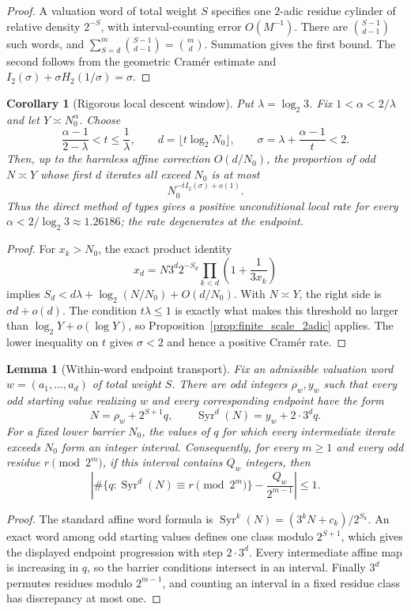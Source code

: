 \documentclass[12pt,a4paper]{article}
\newtheorem{lemma}[theorem]{Lemma}
\newtheorem{corollary}[theorem]{Corollary}
\theoremstyle{remark}
\begin{document}
\begin{proof}
A valuation word of total weight $S$ specifies one $2$-adic residue cylinder
of relative density $2^{-S}$, with interval-counting error $O(M^{-1})$.
There are $\binom{S-1}{d-1}$ such words, and
$\sum_{S=d}^m\binom{S-1}{d-1}=\binom md$.  Summation gives the first bound.
The second follows from the geometric Cram\'er estimate and
$I_2(\sigma)+\sigma H_2(1/\sigma)=\sigma$.
\end{proof}
\begin{corollary}[Rigorous local descent window]
\label{cor:local_descent}
Put $\lambda=\log_2 3$.  Fix
$1<\alpha<2/\lambda$ and let $Y\asymp N_0^\alpha$.  Choose
\[
\frac{\alpha-1}{2-\lambda}<t\le\frac1\lambda,
\qquad d=\lfloor t\log_2N_0\rfloor,
\qquad \sigma=\lambda+\frac{\alpha-1}{t}<2.
\]
Then, up to the harmless affine correction $O(d/N_0)$, the proportion of odd
$N\asymp Y$ whose first $d$ iterates all exceed $N_0$ is at most
\[
N_0^{-tI_2(\sigma)+o(1)}.
\]
Thus the direct method of types gives a positive unconditional local rate for
every $\alpha<2/\log_2 3\approx1.26186$; the rate degenerates at the endpoint.
\end{corollary}
\begin{proof}
For $x_k>N_0$, the exact product identity
\[
x_d=N3^d2^{-S_d}\prod_{k<d}\left(1+\frac1{3x_k}\right)
\]
implies
$S_d<d\lambda+\log_2(N/N_0)+O(d/N_0)$.  With $N\asymp Y$, the right side is
$\sigma d+o(d)$.  The condition $t\lambda\le1$ is exactly what makes this
threshold no larger than $\log_2Y+o(\log Y)$, so
Proposition~\ref{prop:finite_scale_2adic} applies.  The lower inequality on
$t$ gives $\sigma<2$ and hence a positive Cram\'er rate.
\end{proof}
\begin{lemma}[Within-word endpoint transport]
\label{lem:within_word_transport}
Fix an admissible valuation word $w=(a_1,\ldots,a_d)$ of total weight $S$.
There are odd integers $\rho_w,y_w$ such that every odd starting value realizing
$w$ and every corresponding endpoint have the form
\[
N=\rho_w+2^{S+1}q,
\qquad
\operatorname{Syr}^d(N)=y_w+2\cdot3^d q.
\]
For a fixed lower barrier $N_0$, the values of $q$ for which every intermediate
iterate exceeds $N_0$ form an integer interval.  Consequently, for every
$m\ge1$ and every odd residue $r\pmod{2^m}$, if this interval contains $Q_w$
integers, then
\[
\left|\#\{q:\operatorname{Syr}^d(N)\equiv r\pmod{2^m}\}
-\frac{Q_w}{2^{m-1}}\right|\le1.
\]
\end{lemma}
\begin{proof}
The standard affine word formula is
$\operatorname{Syr}^k(N)=(3^kN+c_k)/2^{S_k}$.  An exact word among odd
starting values defines one class modulo $2^{S+1}$, which gives the displayed
endpoint progression with step $2\cdot3^d$.  Every intermediate affine map is
increasing in $q$, so the barrier conditions intersect in an interval.  Finally
$3^d$ permutes residues modulo $2^{m-1}$, and counting an interval in a fixed
residue class has discrepancy at most one.
\end{proof}
\end{document}

